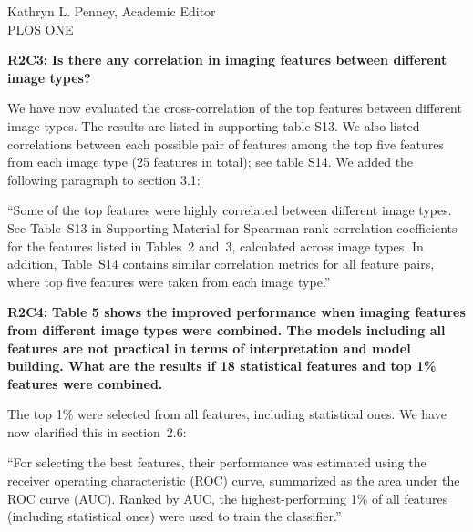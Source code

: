 \documentclass{letter}
\newenvironment{comment}[1]%
  {\vspace{5ex}\par\textbf{#1:}\ignorespaces\bfseries}%
  {\par\ignorespacesafterend}
\newenvironment{reply}%
  {\vspace{2ex}\par}%
  {\par\upshape}
\begin{document}
\begin{letter}{Kathryn L. Penney, Academic Editor \\ PLOS ONE}
\begin{comment}{R2C3}
Is there any correlation in imaging features between different image types?
\end{comment}

\begin{reply}
We have now evaluated the cross-correlation of the top features between different image types. The results are listed in supporting table S13. We also listed correlations between each possible pair of features among the top five features from each image type (25 features in total); see table S14. We added the following paragraph to section 3.1:

``Some of the top features were highly correlated between different image types.
See Table~S13 in Supporting Material for Spearman rank correlation coefficients
for the features listed in Tables~2 and~3, calculated across image types. In
addition, Table~S14 contains similar correlation metrics for all feature pairs,
where top five features were taken from each image type.''
\end{reply}


\begin{comment}{R2C4}
Table 5 shows the improved performance when imaging features from different
image types were combined. The models including all features are not practical
in terms of interpretation and model building. What are the results if 18
statistical features and top 1\% features were combined.
\end{comment}

\begin{reply}
The top 1\% were selected from all features, including statistical ones. We have
now clarified this in section~2.6:

``For selecting the best features, their performance was estimated using the
receiver operating characteristic (ROC) curve, summarized as the area under the
ROC curve (AUC). Ranked by AUC, the highest-performing 1\% of all features
(including statistical ones) were used to train the classifier.''
\end{reply}


\end{letter}
\end{document}
